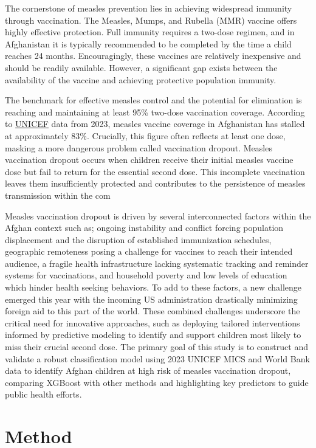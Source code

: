 \documentclass[
  12pt]{article}
\begin{document}
The cornerstone of measles prevention lies in achieving widespread
immunity through vaccination. The Measles, Mumps, and Rubella (MMR)
vaccine offers highly effective protection. Full immunity requires a
two-dose regimen, and in Afghanistan it is typically recommended to be
completed by the time a child reaches 24 months. Encouragingly, these
vaccines are relatively inexpensive and should be readily available.
However, a significant gap exists between the availability of the
vaccine and achieving protective population immunity.

The benchmark for effective measles control and the potential for
elimination is reaching and maintaining at least 95\% two-dose
vaccination coverage. According to
\href{https://www.unicef.org/stories/measles-cases-spiking-globally}{UNICEF}
data from 2023, measles vaccine coverage in Afghanistan has stalled at
approximately 83\%. Crucially, this figure often reflects at least one
dose, masking a more dangerous problem called vaccination dropout.
Measles vaccination dropout occurs when children receive their initial
measles vaccine dose but fail to return for the essential second dose.
This incomplete vaccination leaves them insufficiently protected and
contributes to the persistence of measles transmission within the com

Measles vaccination dropout is driven by several interconnected factors
within the Afghan context such as; ongoing instability and conflict
forcing population displacement and the disruption of established
immunization schedules, geographic remoteness posing a challenge for
vaccines to reach their intended audience, a fragile health
infrastructure lacking systematic tracking and reminder systems for
vaccinations, and household poverty and low levels of education which
hinder health seeking behaviors. To add to these factors, a new
challenge emerged this year with the incoming US administration
drastically minimizing foreign aid to this part of the world. These
combined challenges underscore the critical need for innovative
approaches, such as deploying tailored interventions informed by
predictive modeling to identify and support children most likely to miss
their crucial second dose. The primary goal of this study is to
construct and validate a robust classification model using 2023 UNICEF
MICS and World Bank data to identify Afghan children at high risk of
measles vaccination dropout, comparing XGBoost with other methods and
highlighting key predictors to guide public health efforts.

\section{Method}\label{sec-method}
\end{document}
